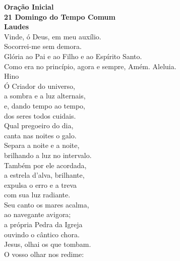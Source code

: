 \documentclass[opennany]{book}
\begin{document}

\cleardoublepage
\begin{center}
    \textbf{Oração Inicial}
    \vspace{.2cm} \\
    \textcolor{VioletRed2}{\textbf{21\textordmasculine{} Domingo do Tempo Comum}}
    \vspace{.2cm} \\
    \textbf{Laudes}
    \vspace{.2cm} \\
    \VbarRed{} Vinde, ó Deus, em meu auxílio. \\
    \RbarRed{} Socorrei-me sem demora. \\
    Glória ao Pai e ao Filho e ao Espírito Santo.\ \textsuperscript{\gresixstar{}} \\
    Como era no princípio, agora e sempre, Amém. Aleluia.
    \vspace{.2cm} \\
    \textcolor{VioletRed2}{Hino}
    \vspace{.2cm} \\
    Ó Criador do universo, \\
    a sombra e a luz alternais, \\
    e, dando tempo ao tempo, \\
    dos seres todos cuidais.
    \vspace{.2cm} \\
    Qual pregoeiro do dia, \\
    canta nas noites o galo. \\
    Separa a noite e a noite, \\
    brilhando a luz no intervalo.
    \vspace{.2cm} \\
    Também por ele acordada, \\
    a estrela d'alva, brilhante, \\
    expulsa o erro e a treva \\
    com sua luz radiante.
    \vspace{.2cm} \\
    Seu canto os mares acalma, \\
    ao navegante avigora; \\
    a própria Pedra da Igreja \\
    ouvindo o cântico chora.
    \vspace{.2cm} \\
    Jesus, olhai os que tombam. \\
    O vosso olhar nos redime: \\

\end{center}
\end{document}
